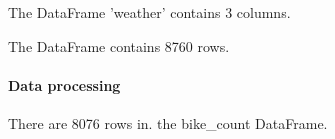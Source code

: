 \documentclass[11pt,a4paper]{article}
\begin{document}
%
The DataFrame 'weather' contains 3 columns.

The DataFrame contains 8760 rows.



\paragraph{Data processing}







There are 8076 rows in. the bike_count DataFrame.
\end{document}
